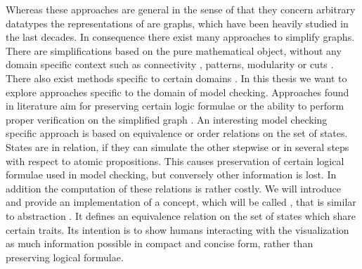 \documentclass[preview]{standalone}
\begin{document}
Whereas these approaches are general in the sense of that they concern arbitrary datatypes the representations of \mdpsN are graphs, which have been heavily studied in the last decades. In consequence there exist many approaches to simplify graphs. There are simplifications based on the pure mathematical object, without any domain specific context such as connectivity \cite{Zhou2010}, patterns\cite{Soldano2014}, modularity \cite{Arenas2007} or cuts \cite{Goerke2009,Fung2011}. There also exist methods specific to certain domains \cite{Ruan2011,Li2022,Yaw2019}. In this thesis we want to explore approaches specific to the domain of model checking. Approaches found in literature aim for preserving certain logic formulae or the ability to perform proper verification on the simplified graph \cite{Rensink2012,Bonchi2013,Boneva2007}. An interesting model checking specific approach is based on equivalence or order relations on the set of states. States are in relation, if they can simulate the other stepwise or in several steps with respect to atomic propositions.
This causes preservation of certain logical formulae used in model checking, but conversely other information is lost.
In addition the computation of these relations is rather costly. We will introduce and provide an implementation of a concept, which will be called \viewN, that is similar to abstraction \cite[pp. 499]{Baier2008}. It defines an equivalence relation on the set of states which share certain traits. Its intention is to show humans interacting with the visualization as much information possible in compact and concise form, rather than preserving logical formulae.
 
\end{document}
